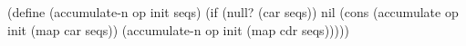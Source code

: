 \begtt\scm
(define (accumulate-n op init seqs)
  (if (null? (car seqs))
    nil
    (cons (accumulate op init (map car seqs))
          (accumulate-n op init (map cdr seqs)))))
\endtt
